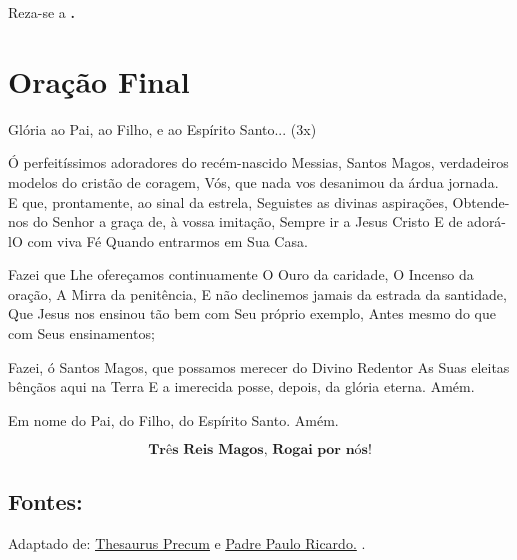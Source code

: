 \documentclass[a4paper,14pt]{extarticle} \usepackage[utf8]{inputenc}
\begin{document}
Reza-se a \textbf{.}



\section{Oração Final} \label{oracao-final}

Glória ao Pai, ao Filho, e ao Espírito Santo... (3x)

Ó perfeitíssimos adoradores do recém-nascido Messias,
Santos Magos, verdadeiros modelos do cristão de coragem, 
Vós, que nada vos desanimou da árdua jornada. 
E que, prontamente, ao sinal da estrela, 
Seguistes as divinas aspirações, 
Obtende-nos do Senhor a graça de, à vossa imitação, 
Sempre ir a Jesus Cristo 
E de adorá-lO com viva Fé 
Quando entrarmos em Sua Casa. 

Fazei que Lhe ofereçamos continuamente
O Ouro da caridade, 
O Incenso da oração, 
A Mirra da penitência, 
E não declinemos jamais da estrada da santidade, 
Que Jesus nos ensinou tão bem com Seu próprio exemplo, 
Antes mesmo do que com Seus ensinamentos;

Fazei, ó Santos Magos, que possamos merecer do Divino Redentor
As Suas eleitas bênçãos aqui na Terra
E a imerecida posse, depois, da glória eterna. Amém. 

Em nome do Pai, do Filho, do Espírito Santo. Amém.

\[
\textbf{ Três Reis Magos, Rogai por nós! }
\]

\vfill

\begin{center}
\subsection*{Fontes:}
Adaptado de: {\color{blue} \underline{\href{https://precantur.blogspot.com/2018/12/novena-aos-rei-magos-ii.html}{Thesaurus Precum}}} e {\color{blue} \underline{\href{https://padrepauloricardo.org/blog/quem-foram-os-tres-reis-magos-e-quando-visitaram-jesus}{Padre Paulo Ricardo}.}} .
\end{center}
\end{document}
